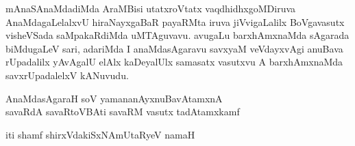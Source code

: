 
\begin{artha}
mAnaSAnaMdadiMda AraMBisi utatxroVtatx vaqdhidhxgoMDiruva AnaMdagaLelalxvU hiraNayxgaBaR payaRMta iruva jiVvigaLalilx BoVgavasutx visheVSada saMpakaRdiMda uMTAguvavu. avugaLu barxhAmxnaMda sAgarada biMdugaLeV sari, adariMda I anaMdasAgaravu savxyaM veVdayxvAgi anuBava rUpadalilx yAvAgalU elAlx kaDeyalUlx samasatx vasutxvu A barxhAmxnaMda savxrUpadalelxV kANuvudu.\\
\end{artha}

\begin{center}
AnaMdasAgaraH soV yamananAyxnuBavAtamxnA \\
savaRdA savaRtoVBAti savaRM vasutx tadAtamxkamf 
\end{center}


\begin{center}
iti shamf shirxVdakiSxNAmUtaRyeV namaH
\end{center}
